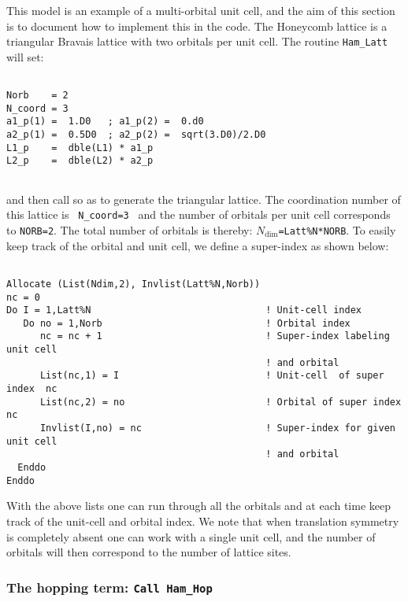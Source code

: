   This model is an example of  a multi-orbital unit cell, and the aim of this section is to document how to implement this in the code.  The  Honeycomb lattice is a  triangular Bravais lattice with two orbitals per unit cell.  The routine  \texttt{Ham\_Latt} will set: 

\begin{lstlisting}

Norb    = 2
N_coord = 3
a1_p(1) =  1.D0   ; a1_p(2) =  0.d0
a2_p(1) =  0.5D0  ; a2_p(2) =  sqrt(3.D0)/2.D0             
L1_p    =  dble(L1) * a1_p
L2_p    =  dble(L2) * a2_p
            
\end{lstlisting}
and then  call  so as to generate the triangular lattice.  The coordination number of this lattice is \texttt{ N\_coord=3 }  and  the number of orbitals per unit cell  corresponds to \texttt{NORB=2}.    The total number of  orbitals  is thereby: \texttt{$N_{\mathrm{dim}}$=Latt\%N*NORB}.    To easily keep track of the orbital and unit cell, we define a  super-index as shown below:


\begin{lstlisting}

Allocate (List(Ndim,2), Invlist(Latt%N,Norb))
nc = 0
Do I = 1,Latt%N                               ! Unit-cell index 
   Do no = 1,Norb                             ! Orbital index
      nc = nc + 1                             ! Super-index labeling unit cell
                                              ! and orbital
      List(nc,1) = I                          ! Unit-cell  of super index  nc
      List(nc,2) = no                         ! Orbital of super index nc
      Invlist(I,no) = nc                      ! Super-index for given  unit cell
                                              ! and orbital
  Enddo
Enddo

\end{lstlisting}

With the above lists one can run through all the orbitals and at each time keep track of the unit-cell and orbital index.    We note that when translation symmetry is completely absent  one can work with a single unit cell, and the  number of orbitals will then correspond to the  number of lattice sites. 

\subsubsection{The hopping term:  \texttt{Call Ham\_Hop} }

